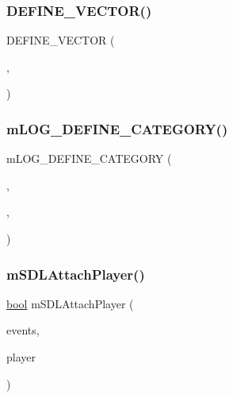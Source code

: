 \subsubsection{\texorpdfstring{D\+E\+F\+I\+N\+E\+\_\+\+V\+E\+C\+T\+O\+R()}{DEFINE\_VECTOR()}}
{\footnotesize\ttfamily D\+E\+F\+I\+N\+E\+\_\+\+V\+E\+C\+T\+OR (\begin{DoxyParamCaption}\item[{S\+D\+L\+\_\+\+Joystick\+List}]{,  }\item[{struct \mbox{\hyperlink{sdl-events_8h_struct_s_d_l___joystick_combo}{S\+D\+L\+\_\+\+Joystick\+Combo}}}]{ }\end{DoxyParamCaption})}

\mbox{\label{sdl-events_8c_a8d78a407dada6b4cee180d0eba20ef2c}} 
\subsubsection{\texorpdfstring{m\+L\+O\+G\+\_\+\+D\+E\+F\+I\+N\+E\+\_\+\+C\+A\+T\+E\+G\+O\+R\+Y()}{mLOG\_DEFINE\_CATEGORY()}}
{\footnotesize\ttfamily m\+L\+O\+G\+\_\+\+D\+E\+F\+I\+N\+E\+\_\+\+C\+A\+T\+E\+G\+O\+RY (\begin{DoxyParamCaption}\item[{S\+D\+L\+\_\+\+E\+V\+E\+N\+TS}]{,  }\item[{\char`\"{}S\+DL Events\char`\"{}}]{,  }\item[{\char`\"{}platform.\+sdl.\+events\char`\"{}}]{ }\end{DoxyParamCaption})}

\mbox{\label{sdl-events_8c_acddd18a03f8a08870ffb4e369814425f}} 
\subsubsection{\texorpdfstring{m\+S\+D\+L\+Attach\+Player()}{mSDLAttachPlayer()}}
{\footnotesize\ttfamily \mbox{\hyperlink{libretro_8h_a4a26dcae73fb7e1528214a068aca317e}{bool}} m\+S\+D\+L\+Attach\+Player (\begin{DoxyParamCaption}\item[{struct \mbox{\hyperlink{sdl-events_8h_structm_s_d_l_events}{m\+S\+D\+L\+Events}} $\ast$}]{events,  }\item[{struct \mbox{\hyperlink{sdl-events_8h_structm_s_d_l_player}{m\+S\+D\+L\+Player}} $\ast$}]{player }\end{DoxyParamCaption})}

